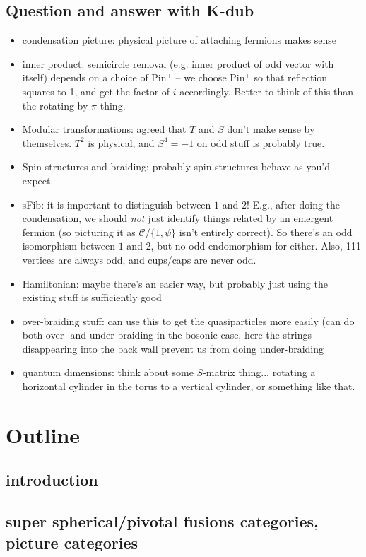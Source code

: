 \documentclass[12pt,a4paper]{article}
\newcommand{\mcc}{\mathcal{C}}
\begin{document}
{{\subsection{Question and answer with K-dub}
\begin{itemize}
    \item condensation picture: physical picture of attaching fermions makes sense
    \item inner product: semicircle removal (e.g. inner product of odd vector with itself) depends on a choice of Pin$^{\pm}$ -- we choose Pin$^+$ so that reflection squares to 1, and get the factor of $i$ accordingly. Better to think of this than the rotating by $\pi$ thing.
    \item Modular transformations: agreed that $T$ and $S$ don't make sense by themselves. $T^2$ is physical, and $S^4 = -1$ on odd stuff is probably true.
    \item Spin structures and braiding: probably spin structures behave as you'd expect.
    \item sFib: it is important to distinguish between $1$ and $2$! E.g., after doing the condensation, we should {\it not} just identify things related by an emergent fermion (so picturing it as $\mcc / \{1,\psi\}$ isn't entirely correct). So there's an odd isomorphism between $1$ and $2$, but no odd endomorphism for either. Also, 111 vertices are always odd, and cups/caps are never odd. 
    \item Hamiltonian: maybe there's an easier way, but probably just using the existing stuff is sufficiently good
    \item over-braiding stuff: can use this to get the quasiparticles more easily (can do both over- and under-braiding in the bosonic case, here the strings disappearing into the back wall prevent us from doing under-braiding
    \item quantum dimensions: think about some $S$-matrix thing... rotating a horizontal cylinder in the torus to a vertical cylinder, or something like that. 
\end{itemize}

\section{Outline}
\subsection{introduction}
\subsection{super spherical/pivotal fusions categories, picture categories}
}}
\end{document}
